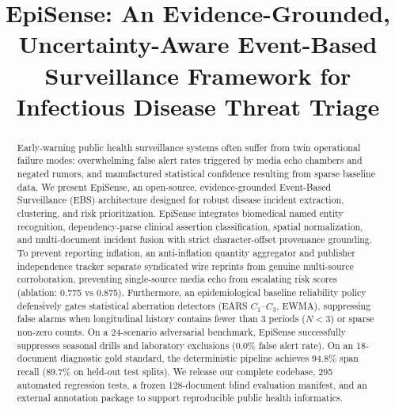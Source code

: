 \documentclass[conference]{IEEEtran}
\begin{document}
\title{EpiSense: An Evidence-Grounded, Uncertainty-Aware Event-Based Surveillance Framework for Infectious Disease Threat Triage}

\author{
}

\maketitle

\begin{abstract}
Early-warning public health surveillance systems often suffer from twin operational failure modes: overwhelming false alert rates triggered by media echo chambers and negated rumors, and manufactured statistical confidence resulting from sparse baseline data. We present EpiSense, an open-source, evidence-grounded Event-Based Surveillance (EBS) architecture designed for robust disease incident extraction, clustering, and risk prioritization. EpiSense integrates biomedical named entity recognition, dependency-parse clinical assertion classification, spatial normalization, and multi-document incident fusion with strict character-offset provenance grounding. To prevent reporting inflation, an anti-inflation quantity aggregator and publisher independence tracker separate syndicated wire reprints from genuine multi-source corroboration, preventing single-source media echo from escalating risk scores (ablation: 0.775 vs 0.875). Furthermore, an epidemiological baseline reliability policy defensively gates statistical aberration detectors (EARS $C_1$--$C_3$, EWMA), suppressing false alarms when longitudinal history contains fewer than 3 periods ($N < 3$) or sparse non-zero counts. On a 24-scenario adversarial benchmark, EpiSense successfully suppresses seasonal drills and laboratory exclusions (0.0\% false alert rate). On an 18-document diagnostic gold standard, the deterministic pipeline achieves 94.8\% span recall (89.7\% on held-out test splits). We release our complete codebase, 295 automated regression tests, a frozen 128-document blind evaluation manifest, and an external annotation package to support reproducible public health informatics.
\end{abstract}
\end{document}
